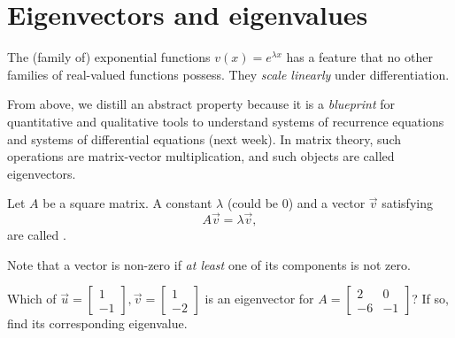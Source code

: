 \documentclass[../main.tex]{subfiles}
\begin{document}
 \section{Eigenvectors and eigenvalues}

The (family of) exponential functions \(v(x) = e^{\lambda x}\) has a feature that no other families of real-valued  functions possess. They \emph{scale linearly} under differentiation.


From above, we distill an abstract property  because it is a \emph{blueprint} for quantitative and qualitative tools to understand systems of recurrence equations and systems of differential equations (next week). In matrix theory, such operations are matrix-vector multiplication, and such objects are called eigenvectors.  

\begin{definition} \label{def:eigenpair}
  Let \(A\) be a square matrix. A constant \(\lambda\) (could be \(0\)) and a  vector \(\vec{v}\) satisfying 
  \begin{equation} \label{eq:eigenpair}
    A \vec{v} = \lambda \vec{v},
  \end{equation}
  are called .

  Note that a vector is non-zero if \emph{at least} one of its components is not zero. 
\end{definition}

\begin{example} \label{ex:eigen-test-vector}
  Which of \(\vec{u} = \begin{bmatrix} 1 \\ -1 \end{bmatrix}, \vec{v} = \begin{bmatrix} 1 \\ -2 \end{bmatrix}\) is an eigenvector for \(A = \begin{bmatrix} 2 & 0 \\ -6 & -1 \end{bmatrix}\)? If so, find its corresponding eigenvalue. 

  \blanks*
\end{example}
\clearpage
\end{document}
